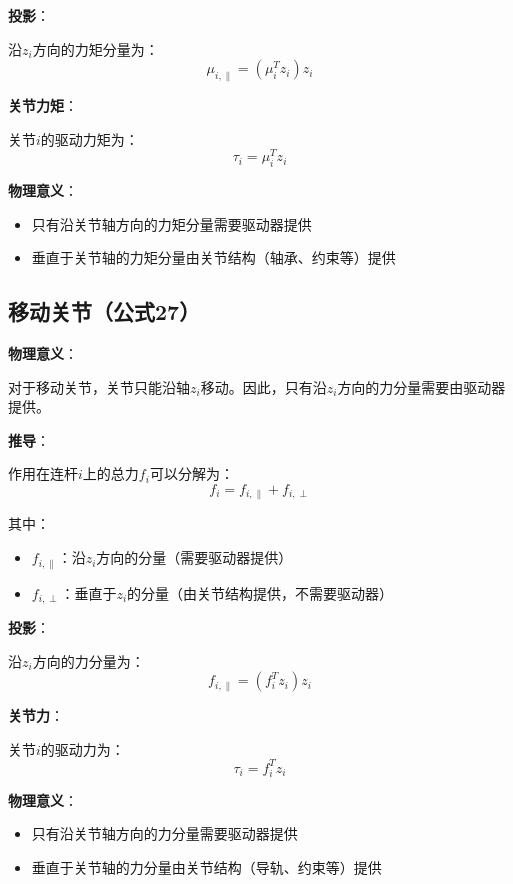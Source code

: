 \documentclass[12pt,a4paper]{article}
\begin{document}
\textbf{投影}：

沿$z_i$方向的力矩分量为：
\begin{equation}
\mu_{i,\parallel} = (\mu_i^T z_i) z_i
\end{equation}

\textbf{关节力矩}：

关节$i$的驱动力矩为：
\begin{equation}
\tau_i = \mu_i^T z_i \tag{26}
\end{equation}

\textbf{物理意义}：
\begin{itemize}
\item 只有沿关节轴方向的力矩分量需要驱动器提供
\item 垂直于关节轴的力矩分量由关节结构（轴承、约束等）提供
\end{itemize}

\subsection{移动关节（公式27）}

\textbf{物理意义}：

对于移动关节，关节只能沿轴$z_i$移动。因此，只有沿$z_i$方向的力分量需要由驱动器提供。

\textbf{推导}：

作用在连杆$i$上的总力$f_i$可以分解为：
\begin{equation}
f_i = f_{i,\parallel} + f_{i,\perp}
\end{equation}

其中：
\begin{itemize}
\item $f_{i,\parallel}$：沿$z_i$方向的分量（需要驱动器提供）
\item $f_{i,\perp}$：垂直于$z_i$的分量（由关节结构提供，不需要驱动器）
\end{itemize}

\textbf{投影}：

沿$z_i$方向的力分量为：
\begin{equation}
f_{i,\parallel} = (f_i^T z_i) z_i
\end{equation}

\textbf{关节力}：

关节$i$的驱动力为：
\begin{equation}
\tau_i = f_i^T z_i \tag{27}
\end{equation}

\textbf{物理意义}：
\begin{itemize}
\item 只有沿关节轴方向的力分量需要驱动器提供
\item 垂直于关节轴的力分量由关节结构（导轨、约束等）提供
\end{itemize}
\end{document}
